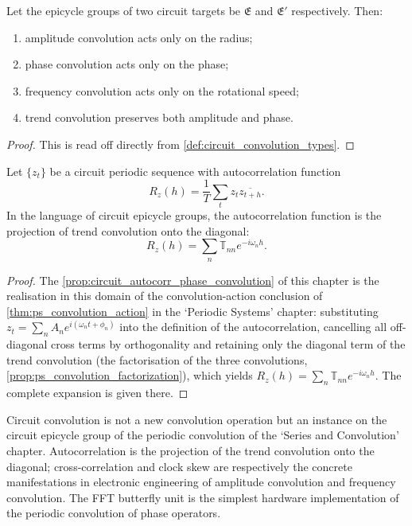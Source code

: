 \begin{theorem}\label{thm:circuit_convolution_action}
Let the epicycle groups of two circuit targets be $\mathfrak E$ and $\mathfrak E'$ respectively. Then:
\begin{enumerate}[label=(\roman*)]
    \item amplitude convolution acts only on the radius;
    \item phase convolution acts only on the phase;
    \item frequency convolution acts only on the rotational speed;
    \item trend convolution preserves both amplitude and phase.
\end{enumerate}
\end{theorem}

\begin{proof}
This is read off directly from \cref{def:circuit_convolution_types}.
\end{proof}

\begin{proposition}\label{prop:circuit_autocorr_phase_convolution}
Let $\{z_t\}$ be a circuit periodic sequence with autocorrelation function
\[
R_z(h)=\frac1T\sum_t z_t\overline{z_{t+h}}.
\]
In the language of circuit epicycle groups, the autocorrelation function is the projection of trend convolution onto the diagonal:
\[
R_z(h)=\sum_n\mathbb T_{nn}e^{-i\omega_n h}.
\]
\end{proposition}

\begin{proof}
The \cref{prop:circuit_autocorr_phase_convolution} of this chapter is the realisation in this domain of the convolution-action conclusion of \cref{thm:ps_convolution_action} in the `Periodic Systems' chapter:
substituting $z_t=\sum_n A_n e^{i(\omega_n t+\phi_n)}$ into the definition of the autocorrelation, cancelling all off-diagonal cross terms by orthogonality and retaining only the diagonal term of the trend convolution
(the factorisation of the three convolutions, \cref{prop:ps_convolution_factorization}), which yields $R_z(h)=\sum_n\mathbb T_{nn}e^{-i\omega_n h}$.
The complete expansion is given there.
\end{proof}

\begin{remark}\label{rem:circuit_convolution_relation}
Circuit convolution is not a new convolution operation but an instance on the circuit epicycle group of the periodic convolution of the `Series and Convolution' chapter. Autocorrelation is the projection of the trend convolution onto the diagonal; cross-correlation and clock skew are respectively the concrete manifestations in electronic engineering of amplitude convolution and frequency convolution. The FFT butterfly unit is the simplest hardware implementation of the periodic convolution of phase operators.
\end{remark}

